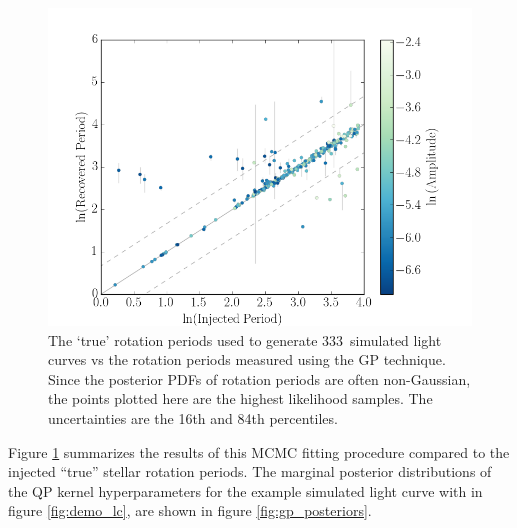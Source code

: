 \documentclass[useAMS, usenatbib, preprint, 12pt]{aastex}
\newcommand{\naigrain}{333}
\begin{document}
\begin{figure}
\begin{center}
\includegraphics[width=6in, clip=true]{figures/comparison_emcee3_13_12_2.png}
\caption{The `true' rotation periods used to generate \naigrain\
simulated light curves vs the rotation periods measured using the GP
technique.
Since the posterior PDFs of rotation periods are often non-Gaussian,
the points plotted here are the highest likelihood samples.
The uncertainties are the 16th and 84th percentiles.}
\label{fig:compare_mcmc}
\end{center}
\end{figure}

Figure \ref{fig:compare_mcmc} summarizes the results of this MCMC fitting procedure
compared to the injected ``true'' stellar rotation periods. 
The marginal posterior distributions of the QP kernel hyperparameters for the
example simulated light curve with in figure \ref{fig:demo_lc}, are shown in
figure \ref{fig:gp_posteriors}.
\end{document}
